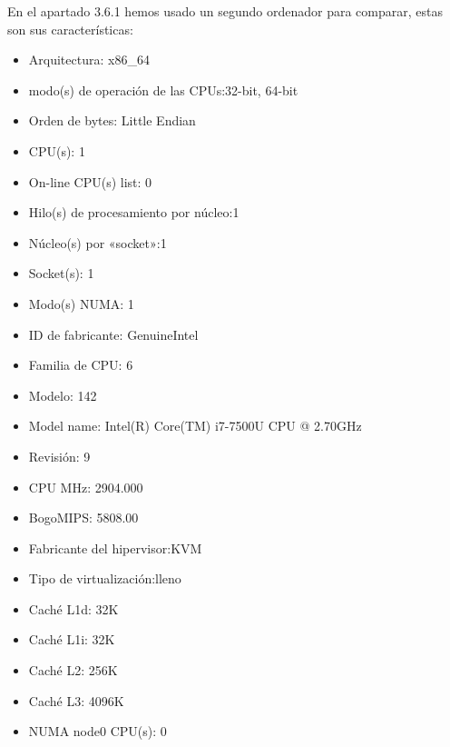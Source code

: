 \documentclass{article}
\begin{document}
En el apartado 3.6.1 hemos usado un segundo ordenador para comparar, estas son sus características:
\begin{itemize}
	\item Arquitectura:          x86\_64
	\item modo(s) de operación de las CPUs:32-bit, 64-bit
	\item Orden de bytes:        Little Endian
	\item CPU(s):                1
	\item On-line CPU(s) list:   0
	\item Hilo(s) de procesamiento por núcleo:1
	\item Núcleo(s) por «socket»:1
	\item Socket(s):             1
	\item Modo(s) NUMA:          1
	\item ID de fabricante:      GenuineIntel
	\item Familia de CPU:        6
	\item Modelo:                142
	\item Model name:            Intel(R) Core(TM) i7-7500U CPU @ 2.70GHz
	\item Revisión:             9
	\item CPU MHz:               2904.000
	\item BogoMIPS:              5808.00
	\item Fabricante del hipervisor:KVM
	\item Tipo de virtualización:lleno
	\item Caché L1d:            32K
	\item Caché L1i:            32K
	\item Caché L2:             256K
	\item Caché L3:             4096K
	\item NUMA node0 CPU(s):     0
\end{itemize}
\end{document}
